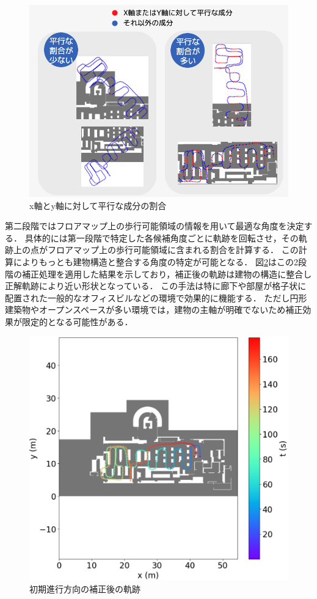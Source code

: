 \begin{figure}[H]
	\centering
	\includegraphics[width=\linewidth]{../image/parallel.jpg}
	\caption{x軸とy軸に対して平行な成分の割合}    \label{fig:parallel}
\end{figure}


第二段階ではフロアマップ上の歩行可能領域の情報を用いて最適な角度を決定する．
具体的には第一段階で特定した各候補角度ごとに軌跡を回転させ，その軌跡上の点がフロアマップ上の歩行可能領域に含まれる割合を計算する．
この計算によりもっとも建物構造と整合する角度の特定が可能となる．
図\ref{fig:pdr-rotate}はこの2段階の補正処理を適用した結果を示しており，補正後の軌跡は建物の構造に整合し
正解軌跡により近い形状となっている．
この手法は特に廊下や部屋が格子状に配置された一般的なオフィスビルなどの環境で効果的に機能する．
ただし円形建築物やオープンスペースが多い環境では，建物の主軸が明確でないため補正効果が限定的となる可能性がある．


\begin{figure}[H]
	\centering
	\includegraphics[width=\linewidth]{../image/pdr-rotate.jpg}
	\caption{初期進行方向の補正後の軌跡}    \label{fig:pdr-rotate}
\end{figure}




